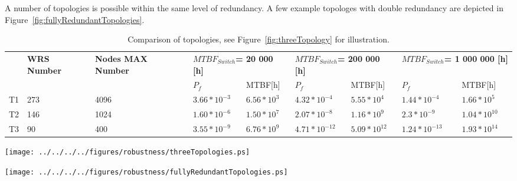 A number of topologies is possible within the same level of redundancy. A few
example topologes with double redundancy are depicted in
Figure~\ref{fig:fullyRedundantTopologies}.

\begin{table}[ht]
\caption{Comparison of topologies, see Figure~\ref{fig:threeTopology}
for illustration.}
\centering
\begin{tabular}{|p{0.5cm}|p{1cm}|p{1.1cm}|p{1.7cm}|p{1.5cm}|p{1.9cm}|p{1.7cm}
|p{1.9cm}|p{1.7cm}|}        \hline
& \textbf{WRS Number} &
\textbf{Nodes MAX Number} &  
\multicolumn{2}{|p{3cm}|}{\textbf{$MTBF_{Switch}$=    20 000 [h] }} &  
\multicolumn{2}{|p{3cm}|}{\textbf{$MTBF_{Switch}$=   200 000 [h] }} &
\multicolumn{2}{|p{3cm}|}{\textbf{$MTBF_{Switch}$= 1 000 000 [h] }}\\
 & & & $P_f$ & MTBF[h] & $P_f$ & MTBF[h] &
$P_f$   & MTBF[h] \\ \hline

T1 &  273 &  4096  
& $ 3.66*10^{-3}$  & $ 6.56*10^{3}$
& $4.32*10^{-4}$  &  $ 5.55*10^{4}$    
& $1.44*10^{-4}$  &  $ 1.66*10^{5}$  \\ \hline

T2 &  146 &  1024  
& $ 1.60*10^{-6}$  &  $ 1.50*10^{7}$
& $ 2.07*10^{-8}$  &  $ 1.16*10^{9}$    
& $ 2.3*10^{-9}$   &  $ 1.04*10^{10}$   \\ \hline

T3 &  90  &  400   
& $ 3.55*10^{-9}$  &  $ 6.76*10^{9}$
& $ 4.71*10^{-12}$ &  $ 5.09*10^{12}$    
& $ 1.24*10^{-13}$ &  $ 1.93*10^{14}$  \\ \hline
\end{tabular}
\label{tab:nonRedundantTopology}
\end{table}


\begin{center}
	\texttt{[image: ../../../../figures/robustness/threeTopologies.ps]}
	\label{fig:threeTopology}
\end{center}

\begin{center}
	\texttt{[image: ../../../../figures/robustness/fullyRedundantTopologies.ps]}
	\label{fig:fullyRedundantTopologies}
\end{center}

